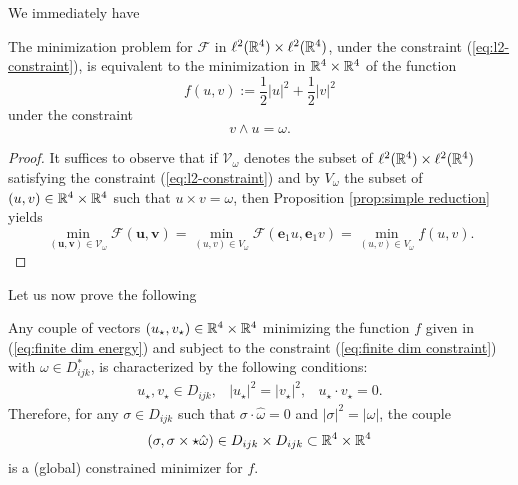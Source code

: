 We immediately have

\begin{corollary}
\label{cor:simple reduction}
The minimization problem for $\mathcal{F}$ in $\ell^2(\mathbb{R}^4) \times \ell^2(\mathbb{R}^4)$, under the constraint (\ref{eq:l2-constraint}), is equivalent to the minimization in $\mathbb{R}^4 \times \mathbb{R}^4$ of the function
\begin{equation}
\label{eq:finite dim energy}
 	f(u,v) := \frac{1}{2}|u|^2 + \frac{1}{2} |v|^2
 \end{equation} 
 under the constraint
 \begin{equation}
 \label{eq:finite dim constraint}
 v \wedge u = \omega.
 \end{equation}
\end{corollary}

\begin{proof}
It suffices to observe that if $\mathcal{V}_{\omega}$ denotes the subset of $\ell^2(\mathbb{R}^4) \times \ell^2(\mathbb{R}^4)$ satisfying the constraint (\ref{eq:l2-constraint}) and by $V_{\omega}$ the subset of $(u, v)  \in \mathbb{R}^4 \times \mathbb{R}^4$ such that $u \times v = \omega$, then Proposition \ref{prop:simple reduction} yields
\begin{equation}
\min_{(\mathbf{u}, \mathbf{v}) \in \mathcal{V}_{\omega}}\mathcal{F}(\mathbf{u}, \mathbf{v}) = \min_{(u, v) \in V_\omega} \mathcal{F}(\mathbf{e}_1 u, \mathbf{e}_1 v) = \min_{(u,v) \in V_{\omega}} f(u,v).
\end{equation}
\end{proof}

Let us now prove the following


\begin{proposition}
\label{prop:finite dim minimization}
Any couple of vectors $(u_{\star}, v_{\star}) \in \mathbb{R}^4 \times \mathbb{R}^4$ minimizing the function $f$ given in (\ref{eq:finite dim energy}) and subject to the constraint (\ref{eq:finite dim constraint}) with $\omega \in D_{ijk}^{*}$, is characterized by the following conditions:
\begin{eqnarray}
\label{eq:finite dim minimization conditions}
u_{\star}, v_{\star} \in D_{ijk}, & 
|u_{\star}|^2 = |v_{\star}|^2, & 
u_{\star} \cdot v_{\star} = 0.
\end{eqnarray}
Therefore, for any $\sigma \in D_{ijk}$ such that $\sigma \cdot \hat{\omega} = 0$ and $|\sigma|^2 = |\omega|$, the couple
\begin{equation}
(\sigma, \sigma \times \star \hat{\omega}) \in D_{ijk} \times D_{ijk} \subset \mathbb{R}^4 \times \mathbb{R}^4
\end{equation}
is a (global) constrained minimizer for $f$.
\end{proposition}

